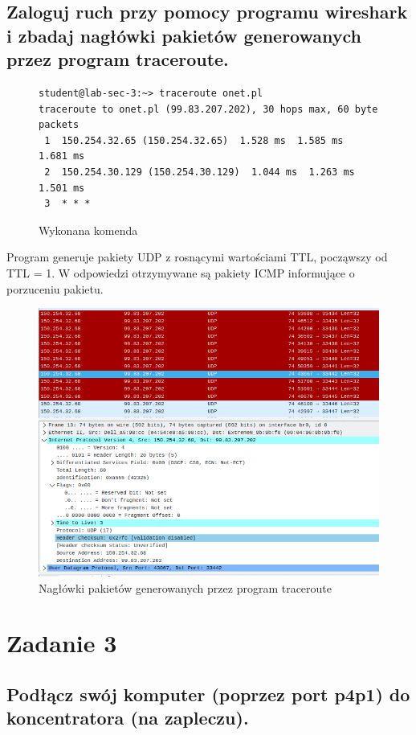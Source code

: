 \documentclass[polish, a4paper]{article}
\begin{document}
\subsection{Zaloguj ruch przy pomocy programu wireshark i zbadaj nagłówki pakietów generowanych przez program traceroute.}


\begin{figure}[H]
\begin{verbatim}
student@lab-sec-3:~> traceroute onet.pl
traceroute to onet.pl (99.83.207.202), 30 hops max, 60 byte packets
 1  150.254.32.65 (150.254.32.65)  1.528 ms  1.585 ms  1.681 ms
 2  150.254.30.129 (150.254.30.129)  1.044 ms  1.263 ms  1.501 ms
 3  * * *
\end{verbatim}
\caption{Wykonana komenda}
\end{figure}

Program generuje pakiety UDP z rosnącymi wartościami TTL, począwszy od TTL = 1. W odpowiedzi otrzymywane są pakiety ICMP informujące o porzuceniu pakietu.

\begin{figure}[H]
\centering
\includegraphics[width=\textwidth]{udp.png}
\caption{Nagłówki pakietów generowanych przez program traceroute}
\end{figure}


\section{Zadanie 3}
\subsection{Podłącz swój komputer (poprzez port p4p1) do koncentratora (na zapleczu).}
\end{document}
